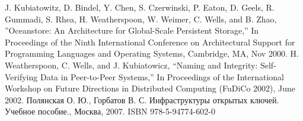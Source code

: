 \begin{thebibliography}{}
	J. Kubiatowitz, D. Bindel, Y. Chen, S. Czerwinski, P. Eaton, D. Geels, R. Gummadi, S. Rhea, H. Weatherspoon, W. Weimer, C. Wells, and B. Zhao, ''Oceanstore: An Architecture for Global-Scale Persistent Storage,'' In Proceedings of the Ninth International Conference on Architectural Support for Programming Languages and Operating Systems, Cambridge, MA, Nov 2000.
	H. Weatherspoon, C. Wells, and J. Kubiatowicz, “Naming and Integrity: Self-Verifying Data in Peer-to-Peer Systems,” In Proceedings of the International Workshop on Future Directions in Distributed Computing (FuDiCo 2002), June 2002.
	Полянская О. Ю., Горбатов В. С. Инфраструктуры открытых ключей. Учебное пособие., Москва, 2007. ISBN 978-5-94774-602-0
\end{thebibliography}
\endgroup

\pagebreak
